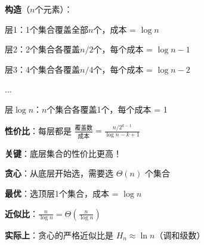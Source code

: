 \documentclass[12pt, a4paper]{ctexart}
\begin{document}
\begin{blackboard}

\textbf{构造}（$n$个元素）：

层1：1个集合覆盖全部$n$个，成本 = $\log n$

层2：2个集合各覆盖$n/2$个，每个成本 = $\log n - 1$

层3：4个集合各覆盖$n/4$个，每个成本 = $\log n - 2$

...

层$\log n$：$n$个集合各覆盖1个，每个成本 = 1

\textbf{性价比}：每层都是 $\frac{\text{覆盖数}}{\text{成本}} = \frac{n/2^{k-1}}{\log n - k + 1}$

\textbf{关键}：底层集合的性价比更高！

\textbf{贪心}：从底层开始选，需要选 $\Theta(n)$ 个集合

\textbf{最优}：选顶层1个集合，成本 = $\log n$

\textbf{近似比}：$\frac{n}{\log n} = \Theta\left(\frac{n}{\log n}\right)$

\textbf{实际上}：贪心的严格近似比是 $H_n \approx \ln n$（调和级数）

\end{blackboard}
\end{document}

